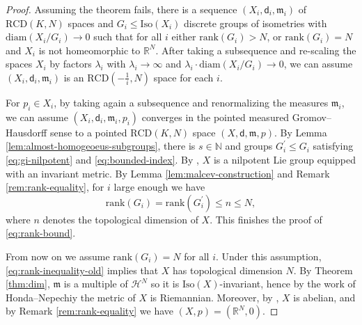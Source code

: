 \documentclass[12pt]{amsart}
\theoremstyle{definition}
\numberwithin{equation}{section}
\newcommand{\rank}{{\text{rank}}}
\newcommand{\diam}{{\text {diam}}}
\newcommand{\iso}{\text{Iso}}
\newcommand{\rcd}{\text{RCD}}
\newcommand{\mm}{\mathfrak{m}}
\begin{document}
\begin{proof}
Assuming the theorem fails, there is a sequence  $(X_i , \mathsf{d}_i , \mm _i  )$ of  $\rcd ( K , N ) $ spaces and $G_i \leq \iso (X_i )$ discrete groups of isometries with $\diam (X_i / G_i) \to 0$ such that for all $i$ either $\rank (G_i ) > N $, or $\rank (G_i ) = N$ and $X_i$ is not homeomorphic to $\mathbb{R}^N$. 
After taking a subsequence and re-scaling the spaces $X_i$ by  factors $\lambda_ i$ with $\lambda _i \to \infty$ and $\lambda_i \cdot \diam (X_i / G_i ) \to 0$, we can assume $(X_i, \mathsf{d}_i, \mm_i) $ is an $\rcd (- \frac{1}{i}, N)$ space for each $i$. 


For $p_i \in X_i$, by taking again a subsequence and renormalizing the measures $\mm_i$, we can assume $(X_i, \mathsf{d}_i, \mm _i,  p_i)$ converges in the pointed measured Gromov--Hausdorff sense to a pointed $\rcd (K,N)$ space $(X, \mathsf{d}, \mm , p)$. By Lemma \ref{lem:almost-homogeoeus-subgroups}, there is $s  \in \mathbb{N} $ and groups $G_i^{\prime} \leq G_i $ satisfying  \eqref{eq:gi-nilpotent} and \eqref{eq:bounded-index}. By  \cite[Theorem 4.1]{zamora-limits}, $X$ is a nilpotent Lie group equipped with an invariant metric. By Lemma \ref{lem:malcev-construction} and Remark \ref{rem:rank-equality},  for $i$ large enough we have
\begin{equation}\label{eq:rank-inequality-old}
    \rank (G_i ) =  \rank (G_i^{\prime})  \leq   n  \leq N,
\end{equation} 
where $n$ denotes the topological dimension of $X$. This  finishes the proof of \eqref{eq:rank-bound}. 


From now on we assume $\rank (G_i ) = N $ for all $i$. Under this assumption,  \eqref{eq:rank-inequality-old} implies that $X$ has topological dimension $N$.  By Theorem \ref{thm:dim}, %
$\mm$ is a multiple of $\mathcal{H}^N$ so it is  $\iso (X)$-invariant, hence by the work of Honda--Nepechiy \cite[Theorem 2]{honda-nepechiy} the metric of $X$ is Riemannian. Moreover, by  \cite[Theorem 2.4]{milnor-invariant}, $X$ is abelian, and by Remark \ref{rem:rank-equality} we have  $(X , p )  = (  \mathbb{R}^N , 0 )$.




\end{proof}
\end{document}
